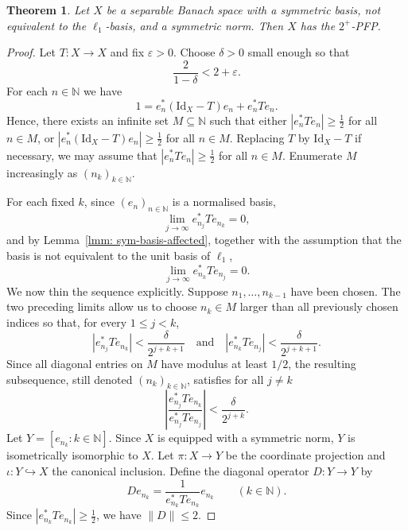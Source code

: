 \documentclass[11pt]{amsart}
\theoremstyle{plain}
\newtheorem{theorem}{Theorem}[section]
\theoremstyle{definition}
\numberwithin{equation}{section}
\newcommand{\norm}[1]{\lVert #1 \rVert}
\newcommand{\N}{\mathbb{N}}
\newcommand{\Id}{\mathrm{Id}}
\renewcommand{\le}{\leqslant}
\renewcommand{\ge}{\geqslant}
\renewcommand{\leq}{\leqslant}
\begin{document}
\begin{theorem}\label{th: Cassaza-Lin}
    Let $X$ be a separable Banach space with a symmetric basis, not equivalent to the $\ell_1$-basis, and a symmetric norm. Then $X$ has the $2^+$-PFP.
\end{theorem}
\begin{proof}
    Let $T\colon X\to X$ and fix $\varepsilon>0$. Choose $\delta>0$ small enough so that
    \[
    \frac{2}{1-\delta}<2+\varepsilon.
    \]
    For each $n\in\N$ we have
    \[
    1=e_n^*(\Id_X-T)e_n+e_n^*Te_n.
    \]
    Hence, there exists an infinite set $M\subseteq\N$ such that either
    $|e_n^*Te_n|\ge \tfrac12$ for all $n\in M$, or
    $|e_n^*(\Id_X-T)e_n|\ge \tfrac12$ for all $n\in M$.
    Replacing $T$ by $\Id_X-T$ if necessary, we may assume that
    $|e_n^*Te_n|\ge \tfrac12$ for all $n\in M$.
    Enumerate $M$ increasingly as $(n_k)_{k\in\N}$.
    
    For each fixed $k$, since $(e_n)_{n \in \N}$ is a normalised basis,
    \[
    \lim_{j\to\infty} e_{n_j}^*Te_{n_k}=0,
    \]
    and by Lemma~\ref{lmm: sym-basis-affected}, together with the assumption that the basis is not equivalent to the unit basis of $\ell_1$,
    \[
    \lim_{j\to\infty} e_{n_k}^*Te_{n_j}=0.
    \]
    We now thin the sequence explicitly.  Suppose $n_1,\ldots,n_{k-1}$ have been chosen.  The two preceding limits allow us to choose $n_k\in M$ larger than all previously chosen indices so that, for every $1\leq j<k$,
    \[
        |e_{n_j}^*Te_{n_k}|<\frac{\delta}{2^{j+k+1}}
        \quad\text{and}\quad
        |e_{n_k}^*Te_{n_j}|<\frac{\delta}{2^{j+k+1}}.
    \]
    Since all diagonal entries on $M$ have modulus at least $1/2$, the resulting subsequence, still denoted $(n_k)_{k\in\N}$, satisfies for all $j\ne k$
    \[
        \left|\frac{e_{n_j}^*Te_{n_k}}{e_{n_j}^*Te_{n_j}}\right|
        < \frac{\delta}{2^{j+k}}.
    \]
    Let $Y= [e_{n_k}:k\in\N ]$. Since $X$ is equipped with a symmetric norm, $Y$ is isometrically isomorphic to $X$.
    Let $\pi\colon X\to Y$ be the coordinate projection and $\iota\colon Y\hookrightarrow X$ the canonical inclusion.
    Define the diagonal operator $D\colon Y\to Y$ by
    \[
    De_{n_k}=\frac{1}{e_{n_k}^*Te_{n_k}}e_{n_k}
    \qquad(k\in\N).
    \]
    Since $|e_{n_k}^*Te_{n_k}|\ge \tfrac12$, we have $\norm{D}\le 2$.
    

\end{proof}
\end{document}
